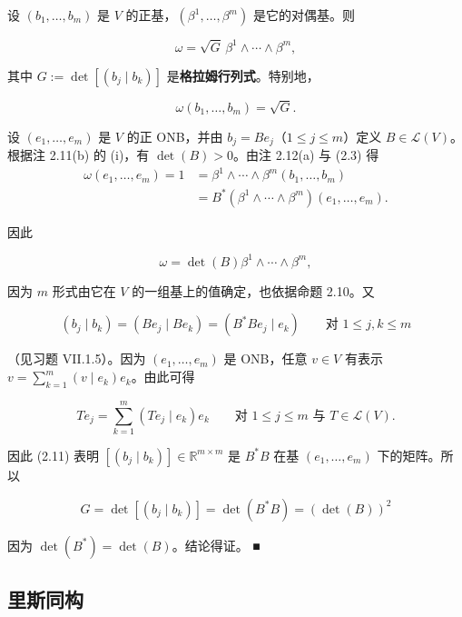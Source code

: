 \begin{proposition}

设 $ (b_{1},\ldots,b_{m}) $ 是 $ V $ 的正基，$ (\beta^{1},\ldots,\beta^{m}) $ 是它的对偶基。则

\[
\omega = \sqrt{G}\,\beta^{1}\wedge\cdots\wedge\beta^{m} ,
\]

其中 $ G := \det[(b_{j}\mid b_{k})] $ 是\textbf{格拉姆行列式}。特别地，

\[
\omega(b_{1},\ldots,b_{m}) = \sqrt{G} .
\]

\proofhead
设 $ (e_{1},\ldots,e_{m}) $ 是 $ V $ 的正 ONB，并由 $ b_{j} = Be_{j} $（$ 1 \le j \le m $）定义 $ B \in \mathcal{L}(V) $。根据注 2.11(b) 的 (i)，有 $ \det(B) > 0 $。由注 2.12(a) 与 (2.3) 得
\begin{equation*}
\begin{aligned}
\omega(e_{1},\ldots,e_{m}) = 1 &= \beta^{1}\wedge\cdots\wedge\beta^{m}(b_{1},\ldots,b_{m}) \\ &= B^{*}(\beta^{1}\wedge\cdots\wedge\beta^{m})(e_{1},\ldots,e_{m}) .
\end{aligned}
\end{equation*}

因此

\[
\omega = \det(B)\beta^{1}\wedge\cdots\wedge\beta^{m} ,
\]

因为 $ m $ 形式由它在 $ V $ 的一组基上的值确定，也依据命题 2.10。又

\begin{equation}
(b_{j}\mid b_{k}) = (Be_{j}\mid Be_{k}) = (B^{*}Be_{j}\mid e_{k}) \qquad \text{对 } 1 \le j,k \le m\tag{2.11}
\end{equation}

（见习题 VII.1.5）。因为 $ (e_{1},\ldots,e_{m}) $ 是 ONB，任意 $ v \in V $ 有表示 $ v = \sum_{k=1}^{m}(v\mid e_{k})e_{k} $。由此可得

\[
Te_{j} = \sum_{k=1}^{m}(Te_{j}\mid e_{k})e_{k} \qquad \text{对 } 1 \le j \le m \text{ 与 } T \in \mathcal{L}(V) .
\]

因此 (2.11) 表明 $ [(b_{j}\mid b_{k})] \in \mathbb{R}^{m\times m} $ 是 $ B^{*}B $ 在基 $ (e_{1},\ldots,e_{m}) $ 下的矩阵。所以

\[
G = \det[(b_{j}\mid b_{k})] = \det(B^{*}B) = (\det(B))^{2}
\]

因为 $ \det(B^{*}) = \det(B) $。结论得证。 \nobreak\hspace{0.35em}■

\end{proposition}

\subsection*{里斯同构}


